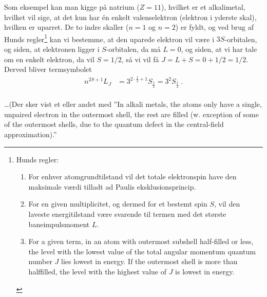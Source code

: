 Som eksempel kan man kigge på natrium ($Z=11$), hvilket er et alkalimetal, hvilket vil sige, at det kun har én enkelt valenselektron (elektron i yderste skal), hvilken er uparret. De to indre skaller ($n=1$ og $n=2$) er fyldt, og ved brug af Hunds regler\footnote{Hunds regler:
\begin{enumerate}
    \item For enhver atomgrundtilstand vil det totale elektronspin have den maksimale værdi tilladt ad Paulis eksklusionsprincip.
    \item For en given multiplicitet, og dermed for et bestemt spin $S$, vil den laveste energitilstand være svarende til termen med det største baneimpulsmoment $L$.
    \item For a given term, in an atom with outermost subshell half-filled or less, the level with the lowest value of the total angular momentum quantum number $J$ lies lowest in energy. If the outermost shell is more than halffilled, the level with the highest value of $J$ is lowest in energy.
\end{enumerate}
} kan vi bestemme, at den uparede elektron vil være i $3S$-orbitalen, og siden, at elektronen ligger i $S$-orbitalen, da må $L = 0$, og siden, at vi har tale om en enkelt elektron, da vil $S = 1/2$, så vi vil få $J = L + S = 0 + 1/2 = 1/2$. Derved bliver termsymbolet
\begin{align}
    n^{2S+1}L_J &= 3^{2 \cdot \frac{1}{2} + 1}S_\frac{1}{2} = 3^2S_\frac{1}{2} \: .
\end{align}
$ $\\\\

\ldots (Der sker vist et eller andet med ''In alkali metals, the atoms only have a single, unpaired electron in the outermost shell, the rest are filled (w.
exception of some of the outermost shells, due to the quantum defect in the central-field approximation).''